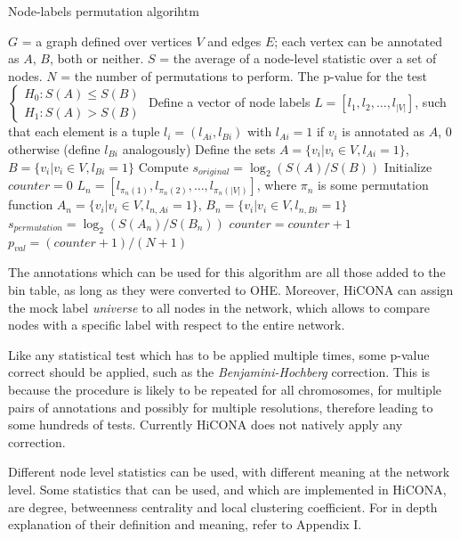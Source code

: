 \begin{algorithm}
\caption{Node-labels permutation algorihtm}\label{alg:labelPermutations}
\begin{algorithmic}[1]
\Require $G$ = a graph defined over vertices $V$ and edges $E$; each vertex can be annotated as $A$, $B$, both or neither. $S$ = the average of a node-level statistic over a set of nodes. $N$ = the number of permutations to perform.
\Ensure The p-value for the test $\begin{cases} H_0: S(A) \leq S(B) \\ H_1: S(A) > S(B) \end{cases}$
\State Define a vector of node labels $L = \left[l_1, l_2, \dots, l_{|V|}\right]$, such that each element is a tuple $l_i = (l_{Ai}, l_{Bi})$ with $l_{Ai} = 1$ if $v_i$ is annotated as $A$, 0 otherwise (define $l_{Bi}$ analogously)
\State Define the sets $A = \{v_i | v_i \in V, l_{Ai} = 1\}$, $B = \{v_i | v_i \in V, l_{Bi} = 1\}$
\State Compute $s_{original} = \log_2(S(A)/S(B))$
\State Initialize $counter = 0$ 
    \State $L_n = [l_{\pi_n(1)}, l_{\pi_n(2)}, \dots, l_{\pi_n(|V|)}]$, where $\pi_n$ is some permutation function
    \State $A_n = \{v_i | v_i \in V, l_{n, Ai}=1\}$, $B_n = \{v_i | v_i \in V, l_{n, Bi}=1\}$
    \State $s_{permutation} = \log_2(S(A_n)/S(B_n))$
        \State $counter = counter + 1$
    \EndIf
\EndFor
\State $p_{val} = (counter + 1) / (N + 1)$
\end{algorithmic}
\end{algorithm}

The annotations which can be used for this algorithm are all those added to the bin table, as long as they were converted to OHE. Moreover, HiCONA can assign the mock label \emph{universe} to all nodes in the network, which allows to compare nodes with a specific label with respect to the entire network.

Like any statistical test which has to be applied multiple times, some p-value correct should be applied, such as the \emph{Benjamini-Hochberg} correction. This is because the procedure is likely to be repeated for all chromosomes, for multiple pairs of annotations and possibly for multiple resolutions, therefore leading to some hundreds of tests. Currently HiCONA does not natively apply any correction.

Different node level statistics can be used, with different meaning at the network level. Some statistics that can be used, and which are implemented in HiCONA, are degree, betweenness centrality and local clustering coefficient. For in depth explanation of their definition and meaning, refer to Appendix I.


